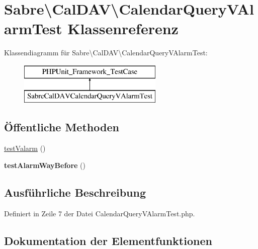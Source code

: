 \hypertarget{class_sabre_1_1_cal_d_a_v_1_1_calendar_query_v_alarm_test}{}\section{Sabre\textbackslash{}Cal\+D\+AV\textbackslash{}Calendar\+Query\+V\+Alarm\+Test Klassenreferenz}
\label{class_sabre_1_1_cal_d_a_v_1_1_calendar_query_v_alarm_test}
Klassendiagramm für Sabre\textbackslash{}Cal\+D\+AV\textbackslash{}Calendar\+Query\+V\+Alarm\+Test\+:\begin{figure}[H]
\begin{center}
\leavevmode
\includegraphics[height=2.000000cm]{class_sabre_1_1_cal_d_a_v_1_1_calendar_query_v_alarm_test}
\end{center}
\end{figure}
\subsection*{Öffentliche Methoden}
\begin{DoxyCompactItemize}
\item 
\mbox{\hyperlink{class_sabre_1_1_cal_d_a_v_1_1_calendar_query_v_alarm_test_a7b2f24906d4a7b538c45e17c0b430e2b}{test\+Valarm}} ()
\item 
\mbox{\label{class_sabre_1_1_cal_d_a_v_1_1_calendar_query_v_alarm_test_abe90fce5864336d3b86632ef276765be}} 
{\bfseries test\+Alarm\+Way\+Before} ()
\end{DoxyCompactItemize}


\subsection{Ausführliche Beschreibung}


Definiert in Zeile 7 der Datei Calendar\+Query\+V\+Alarm\+Test.\+php.



\subsection{Dokumentation der Elementfunktionen}
\mbox{\label{class_sabre_1_1_cal_d_a_v_1_1_calendar_query_v_alarm_test_a7b2f24906d4a7b538c45e17c0b430e2b}} 
